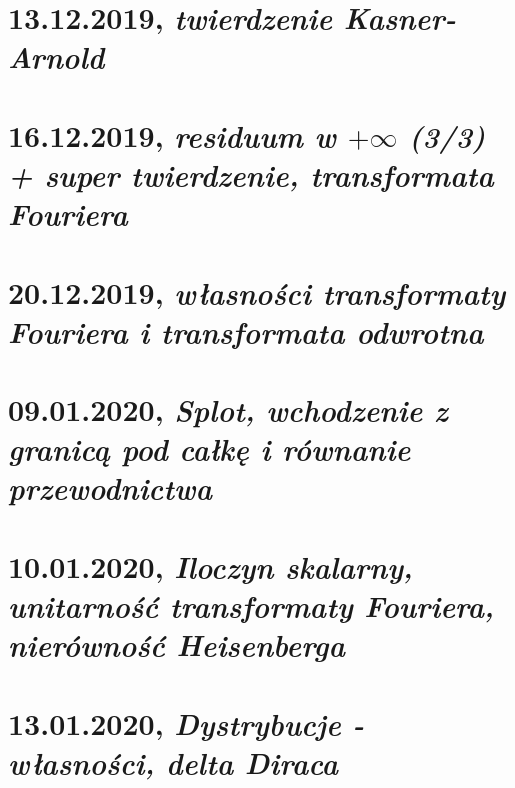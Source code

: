 \documentclass[b5paper]{memoir}
\begin{document}
\chapter{13.12.2019, \textit{twierdzenie Kasner-Arnold}}

\chapter{16.12.2019, \textit{residuum w $+\infty$ (3/3) + super twierdzenie, transformata Fouriera}}

\chapter{20.12.2019, \textit{własności transformaty Fouriera i transformata odwrotna}}

\chapter{09.01.2020, \textit{Splot, wchodzenie z granicą pod całkę i równanie przewodnictwa}}

\chapter{10.01.2020, \textit{Iloczyn skalarny, unitarność transformaty Fouriera, nierówność Heisenberga}}

\chapter{13.01.2020, \textit{Dystrybucje - własności, delta Diraca}}

\end{document}
